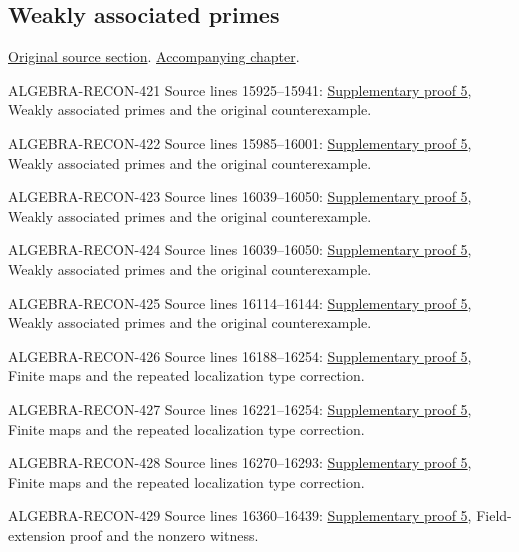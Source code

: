 \subsection{Weakly associated primes}
\hypertarget{algebra-source-section-weakly-ass}{}
\noindent\href{https://github.com/stacks/stacks-project/blob/a04446e57ec1fbc252a871afcec7752fb2807b14/algebra.tex\#L15925}{Original source section}. \href{algebra.pdf\#nameddest=section-weakly-ass}{Accompanying chapter}.

\begin{AlgebraSourceRoutes}
\item[ALGEBRA-RECON-421] Source lines 15925--15941: \hyperlink{algebra_symbolic_weakass_notes_20260927}{Supplementary proof 5}, Weakly associated primes and the original counterexample.
\item[ALGEBRA-RECON-422] Source lines 15985--16001: \hyperlink{algebra_symbolic_weakass_notes_20260927}{Supplementary proof 5}, Weakly associated primes and the original counterexample.
\item[ALGEBRA-RECON-423] Source lines 16039--16050: \hyperlink{algebra_symbolic_weakass_notes_20260927}{Supplementary proof 5}, Weakly associated primes and the original counterexample.
\item[ALGEBRA-RECON-424] Source lines 16039--16050: \hyperlink{algebra_symbolic_weakass_notes_20260927}{Supplementary proof 5}, Weakly associated primes and the original counterexample.
\item[ALGEBRA-RECON-425] Source lines 16114--16144: \hyperlink{algebra_symbolic_weakass_notes_20260927}{Supplementary proof 5}, Weakly associated primes and the original counterexample.
\item[ALGEBRA-RECON-426] Source lines 16188--16254: \hyperlink{algebra_symbolic_weakass_notes_20260927}{Supplementary proof 5}, Finite maps and the repeated localization type correction.
\item[ALGEBRA-RECON-427] Source lines 16221--16254: \hyperlink{algebra_symbolic_weakass_notes_20260927}{Supplementary proof 5}, Finite maps and the repeated localization type correction.
\item[ALGEBRA-RECON-428] Source lines 16270--16293: \hyperlink{algebra_symbolic_weakass_notes_20260927}{Supplementary proof 5}, Finite maps and the repeated localization type correction.
\item[ALGEBRA-RECON-429] Source lines 16360--16439: \hyperlink{algebra_symbolic_weakass_notes_20260927}{Supplementary proof 5}, Field-extension proof and the nonzero witness.

\end{AlgebraSourceRoutes}
